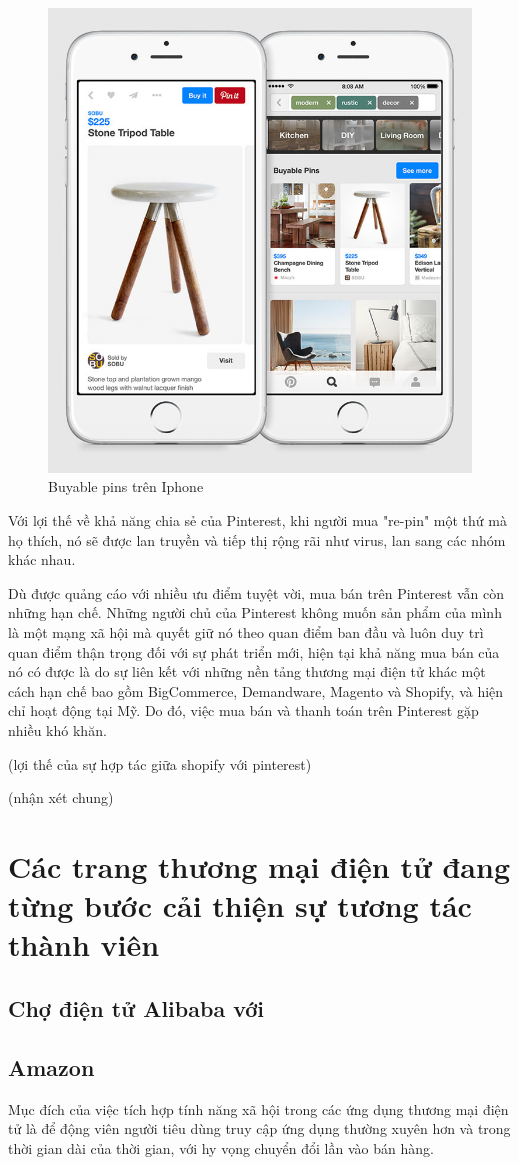 \begin{figure}[H]
	\centering
	\includegraphics[scale=.4]{img/pin-buypins.jpg} 
	\caption{Buyable pins trên Iphone}
\end{figure}

Với lợi thế về khả năng chia sẻ của Pinterest, khi người mua "re-pin" một thứ mà họ thích, nó sẽ được lan truyền và tiếp thị rộng rãi như virus, lan sang các nhóm khác nhau. 

Dù được quảng cáo với nhiều ưu điểm tuyệt vời, mua bán trên Pinterest vẫn còn những hạn chế. Những người chủ của Pinterest không muốn sản phẩm của mình là một mạng xã hội mà quyết giữ nó theo quan điểm ban đầu và luôn duy trì quan điểm thận trọng đối với sự phát triển mới\cite{AllYouNeedtoKnowAboutPinterestBuyablePins}, hiện tại khả năng mua bán của nó có được là do sự liên kết với những nền tảng thương mại điện tử khác một cách hạn chế bao gồm BigCommerce, Demandware, Magento và Shopify, và hiện chỉ hoạt động tại Mỹ. Do đó, việc mua bán và thanh toán trên Pinterest gặp nhiều khó khăn.

(lợi thế của sự hợp tác giữa shopify với pinterest)

(nhận xét chung)
\section{Các trang thương mại điện tử đang từng bước cải thiện sự tương tác thành viên}

\subsection{Chợ điện tử Alibaba với }

\subsection{Amazon}

Mục đích của việc tích hợp tính năng xã hội trong các ứng dụng thương mại điện tử là để động viên người tiêu dùng truy cập ứng dụng thường xuyên hơn và trong thời gian dài của thời gian, với hy vọng chuyển đổi lần vào bán hàng.

